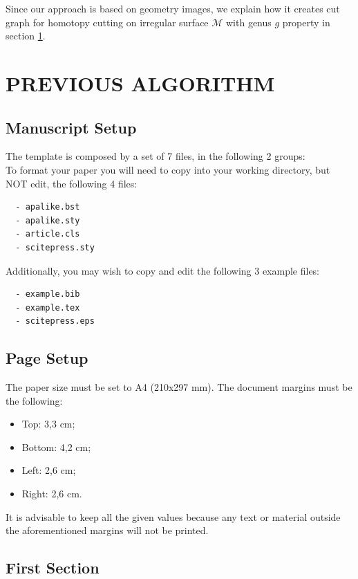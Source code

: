 \documentclass[a4paper,twoside]{article}
\begin{document}
Since our approach is based on geometry images, we explain how it creates cut graph for homotopy cutting on irregular surface $\mathscr{M}$ with genus $g$ property in section \ref{sec:previous algorithm}.
\section{\uppercase{Previous Algorithm}}
\label{sec:previous algorithm}

\subsection{Manuscript Setup}

\noindent The template is composed by a set of 7 files, in the
following 2 groups:\\
 To format your paper you will need to copy
into your working directory, but NOT edit, the following 4 files:
\begin{verbatim}
  - apalike.bst
  - apalike.sty
  - article.cls
  - scitepress.sty
\end{verbatim}

 Additionally, you may wish to copy and edit
the following 3 example files:
\begin{verbatim}
  - example.bib
  - example.tex
  - scitepress.eps
\end{verbatim}


\subsection{Page Setup}

The paper size must be set to A4 (210x297 mm). The document
margins must be the following:

\begin{itemize}
    \item Top: 3,3 cm;
    \item Bottom: 4,2 cm;
    \item Left: 2,6 cm;
    \item Right: 2,6 cm.
\end{itemize}

It is advisable to keep all the given values because any text or
material outside the aforementioned margins will not be printed.

\subsection{First Section}
\end{document}
